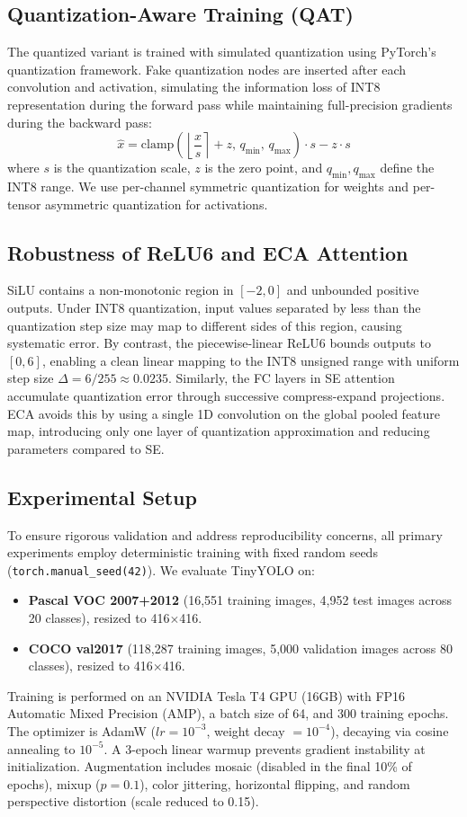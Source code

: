 \documentclass[article,submit,moreauthors,pdftex,10pt,a4paper]{article}
\begin{document}
\subsection{Quantization-Aware Training (QAT)}
The quantized variant is trained with simulated quantization using PyTorch's quantization framework. Fake quantization nodes are inserted after each convolution and activation, simulating the information loss of INT8 representation during the forward pass while maintaining full-precision gradients during the backward pass:
\begin{equation}
\hat{x} = \text{clamp}\left(\left\lfloor \frac{x}{s} \right\rceil + z, \, q_{\min}, \, q_{\max}\right) \cdot s - z \cdot s
\end{equation}
where $s$ is the quantization scale, $z$ is the zero point, and $q_{\min}, q_{\max}$ define the INT8 range. We use per-channel symmetric quantization for weights and per-tensor asymmetric quantization for activations.

\subsection{Robustness of ReLU6 and ECA Attention}
SiLU contains a non-monotonic region in $[-2, 0]$ and unbounded positive outputs. Under INT8 quantization, input values separated by less than the quantization step size may map to different sides of this region, causing systematic error. By contrast, the piecewise-linear ReLU6 bounds outputs to $[0, 6]$, enabling a clean linear mapping to the INT8 unsigned range with uniform step size $\Delta = 6/255 \approx 0.0235$. Similarly, the FC layers in SE attention accumulate quantization error through successive compress-expand projections. ECA avoids this by using a single 1D convolution on the global pooled feature map, introducing only one layer of quantization approximation and reducing parameters compared to SE.

\subsection{Experimental Setup}
To ensure rigorous validation and address reproducibility concerns, all primary experiments employ deterministic training with fixed random seeds (\texttt{torch.manual\_seed(42)}).
We evaluate TinyYOLO on:
\begin{itemize}
\item \textbf{Pascal VOC 2007+2012} (16,551 training images, 4,952 test images across 20 classes), resized to 416$\times$416.
\item \textbf{COCO val2017} (118,287 training images, 5,000 validation images across 80 classes), resized to 416$\times$416.
\end{itemize}
Training is performed on an NVIDIA Tesla T4 GPU (16GB) with FP16 Automatic Mixed Precision (AMP), a batch size of 64, and 300 training epochs. The optimizer is AdamW ($lr=10^{-3}$, weight decay $=10^{-4}$), decaying via cosine annealing to $10^{-5}$. A 3-epoch linear warmup prevents gradient instability at initialization. Augmentation includes mosaic (disabled in the final 10\% of epochs), mixup ($p=0.1$), color jittering, horizontal flipping, and random perspective distortion (scale reduced to 0.15).
\end{document}
